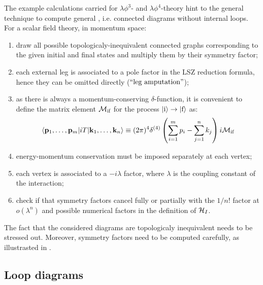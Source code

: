 The example calculations carried for $ \lambda \phi^3 $- and $ \lambda \phi^4 $-theory hint to the general technique to compute general , i.e. connected diagrams without internal loops. For a scalar field theory, in momentum space:
\begin{enumerate}
  \item draw all possible topologicaly-inequivalent connected graphs corresponding to the given initial and final states and multiply them by their symmetry factor;
  \item each external leg is associated to a pole factor in the LSZ reduction formula, hence they can be omitted directly ($ ``\text{leg amputation}" $);
  \item as there is always a momentum-conserving $ \delta $-function, it is convenient to define the matrix element $ \mathcal{M}_\text{if} $ for the process $ \ket{\text{i}} \rightarrow \ket{\text{f}} $ as:
    \begin{equation}
      \braket{\mathbf{p}_1 , \dots , \mathbf{p}_m | i T | \mathbf{k}_1 , \dots , \mathbf{k}_n} \equiv (2\pi)^4 \delta^{(4)}\left( \sum_{i = 1}^{m} p_i - \sum_{j = 1}^{n} k_j \right) i \mathcal{M}_\text{if}
      \label{eq:mat-el}
    \end{equation}
  \item energy-momentum conservation must be imposed separately at each vertex;
  \item each vertex is associated to a $ -i \lambda $ factor, where $ \lambda $ is the coupling constant of the interaction;
  \item check if that symmetry factors cancel fully or partially with the $ 1/n! $ factor at $ o(\lambda^n) $ and possible numerical factors in the definition of $ \mathcal{H}_I $.
\end{enumerate}

The fact that the considered diagrams are topologicaly inequivalent needs to be stressed out. Moreover, symmetry factors need to be computed carefully, as illustrasted in .

\subsection{Loop diagrams}

